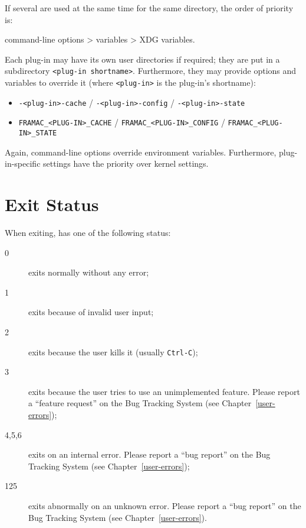 If several are used at the same time for the same directory, the order of
priority is: \\
\centerline{\FramaC command-line options > \FramaC variables > XDG variables.}

Each \FramaC plug-in may have its own user directories if required; they are
put in a subdirectory \lstinline{<plug-in shortname>}. Furthermore, they may
provide options and variables to override it (where \lstinline{<plug-in>} is
the plug-in's shortname):
\begin{itemize}
\item \lstinline{-<plug-in>-cache} / \lstinline{-<plug-in>-config} /
  \lstinline{-<plug-in>-state}
\item \lstinline{FRAMAC_<PLUG-IN>_CACHE} / \lstinline{FRAMAC_<PLUG-IN>_CONFIG} /
  \lstinline{FRAMAC_<PLUG-IN>_STATE}
\end{itemize}

Again, command-line options override environment variables. Furthermore,
plug-in-specific settings have the priority over kernel settings.

\section{Exit Status}

When exiting, \FramaC has one of the following status:
\begin{description}
\item[0] \FramaC exits normally without any error;
\item[1] \FramaC exits because of invalid user input;
\item[2] \FramaC exits because the user kills it (usually \via \texttt{Ctrl-C});
\item[3] \FramaC exits because the user tries to use an unimplemented feature.
  Please report a ``feature request'' on the Bug Tracking System (see
  Chapter~\ref{user-errors});
\item[4,5,6] \FramaC exits on an internal error. Please report a ``bug report'' on
  the Bug Tracking System (see Chapter~\ref{user-errors});
\item[125] \FramaC exits abnormally on an unknown error. Please report a ``bug
  report'' on the Bug Tracking System (see Chapter~\ref{user-errors}).
\end{description}

